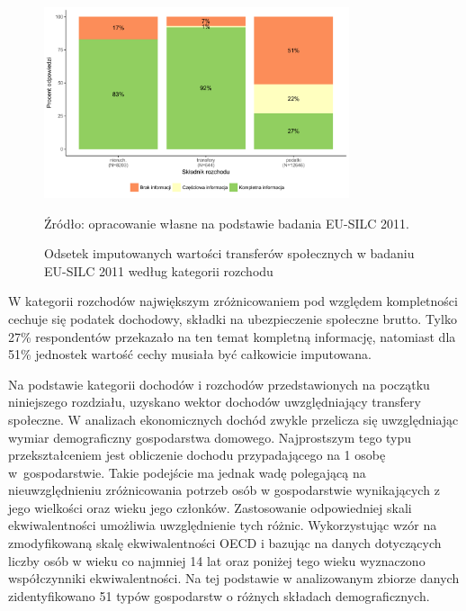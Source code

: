 \begin{figure}[htp]
\centering
\includegraphics[width=0.8\textwidth]{04_wykresy/tranfery_spoleczne_imputacja-1.pdf}
\caption{Odsetek imputowanych wartości transferów społecznych w badaniu EU-SILC 2011 według kategorii rozchodu}
\small{Źródło: opracowanie własne na podstawie badania EU-SILC 2011.}
\label{fig:trans_spol_imp}
\end{figure}

W kategorii rozchodów największym zróżnicowaniem pod względem kompletności cechuje się podatek dochodowy, składki na ubezpieczenie społeczne brutto. Tylko 27\% respondentów przekazało na ten temat kompletną informację, natomiast dla 51\% jednostek wartość cechy musiała być całkowicie imputowana.


Na podstawie kategorii dochodów i rozchodów przedstawionych na początku niniejszego rozdziału, uzyskano wektor dochodów uwzględniający transfery społeczne. W analizach ekonomicznych dochód zwykle przelicza się uwzględniając wymiar demograficzny gospodarstwa domowego. Najprostszym tego typu przekształceniem jest obliczenie dochodu przypadającego na 1 osobę w~gospodarstwie. Takie podejście ma jednak wadę polegającą na nieuwzględnieniu zróżnicowania potrzeb osób w gospodarstwie wynikających z jego wielkości oraz wieku jego członków. Zastosowanie odpowiedniej skali ekwiwalentności umożliwia uwzględnienie tych różnic. Wykorzystując wzór na zmodyfikowaną skalę ekwiwalentności OECD i bazując na danych dotyczących liczby osób w wieku co najmniej 14 lat oraz poniżej tego wieku wyznaczono współczynniki ekwiwalentności. Na tej podstawie w analizowanym zbiorze danych zidentyfikowano 51 typów gospodarstw o różnych składach demograficznych. 

